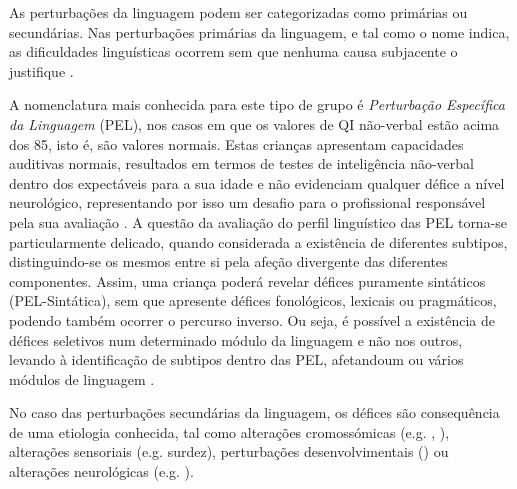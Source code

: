 \documentclass[output=paper]{LSP/langsci}
\begin{document}
As perturbações da linguagem podem ser categorizadas como primárias ou secundárias. Nas perturbações primárias da linguagem, e tal como o nome indica, as dificuldades linguísticas ocorrem sem que nenhuma causa subjacente o justifique \citep{schuele2004}.

A nomenclatura mais conhecida para este tipo de grupo é \textit{Perturbação Específica da Linguagem} (PEL), nos casos em que os valores de QI não-verbal estão acima dos 85, isto é, são valores normais. Estas crianças apresentam capacidades auditivas normais, resultados em termos de testes de inteligência não-verbal dentro dos expectáveis para a sua idade e não evidenciam qualquer défice a nível neurológico, representando por isso um desafio para o profissional responsável pela sua avaliação \citep{leonard2014}. A questão da avaliação do perfil linguístico das PEL torna-se particularmente delicado, quando considerada a existência de diferentes subtipos, distinguindo-se os mesmos entre si pela afeção divergente das diferentes componentes. Assim, uma criança poderá revelar défices puramente sintáticos (PEL-Sintática), sem que apresente défices fonológicos, lexicais ou pragmáticos, podendo também ocorrer o percurso inverso. Ou seja, é possível a existência de défices seletivos num determinado módulo da linguagem e não nos outros, levando à identificação de subtipos dentro das PEL, afetando\largerpage um ou vários módulos de linguagem \citep{friedmannnovogrodsky2008}.

No caso das perturbações secundárias da linguagem, os défices são consequência de uma etiologia conhecida, tal como alterações cromossómicas (e.g. , ), alterações sensoriais (e.g. surdez), perturbações desenvolvimentais () ou alterações neurológicas (e.g. ). 
\end{document}
